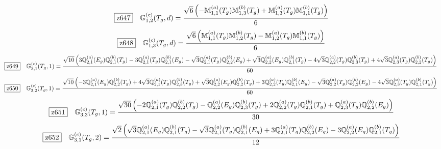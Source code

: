 \documentclass[fleqn,10pt,landscape]{jsarticle}
\begin{document}
\begin{dmath*}
\hspace*{3mm}\fbox{z647}\quad \mathbb{G}_{1,2}^{(c)}(T_{g},d)=\frac{\sqrt{6} \left(- \mathbb{M}_{1,1}^{(a)}(T_{g}) \mathbb{M}_{1,3}^{(b)}(T_{g}) + \mathbb{M}_{1,3}^{(a)}(T_{g}) \mathbb{M}_{1,1}^{(b)}(T_{g})\right)}{6}
\end{dmath*}
\begin{dmath*}
\hspace*{3mm}\fbox{z648}\quad \mathbb{G}_{1,3}^{(c)}(T_{g},d)=\frac{\sqrt{6} \left(\mathbb{M}_{1,1}^{(a)}(T_{g}) \mathbb{M}_{1,2}^{(b)}(T_{g}) - \mathbb{M}_{1,2}^{(a)}(T_{g}) \mathbb{M}_{1,1}^{(b)}(T_{g})\right)}{6}
\end{dmath*}
\begin{dmath*}
\hspace*{3mm}\fbox{z649}\quad \mathbb{G}_{3,1}^{(c)}(T_{g},1)=\frac{\sqrt{10} \left(3 \mathbb{Q}_{2,1}^{(a)}(E_{g}) \mathbb{Q}_{2,1}^{(b)}(T_{g}) - 3 \mathbb{Q}_{2,1}^{(a)}(T_{g}) \mathbb{Q}_{2,1}^{(b)}(E_{g}) - \sqrt{3} \mathbb{Q}_{2,1}^{(a)}(T_{g}) \mathbb{Q}_{2,2}^{(b)}(E_{g}) + \sqrt{3} \mathbb{Q}_{2,2}^{(a)}(E_{g}) \mathbb{Q}_{2,1}^{(b)}(T_{g}) - 4 \sqrt{3} \mathbb{Q}_{2,2}^{(a)}(T_{g}) \mathbb{Q}_{2,3}^{(b)}(T_{g}) + 4 \sqrt{3} \mathbb{Q}_{2,3}^{(a)}(T_{g}) \mathbb{Q}_{2,2}^{(b)}(T_{g})\right)}{60}
\end{dmath*}
\begin{dmath*}
\hspace*{3mm}\fbox{z650}\quad \mathbb{G}_{3,2}^{(c)}(T_{g},1)=\frac{\sqrt{10} \left(- 3 \mathbb{Q}_{2,1}^{(a)}(E_{g}) \mathbb{Q}_{2,2}^{(b)}(T_{g}) + 4 \sqrt{3} \mathbb{Q}_{2,1}^{(a)}(T_{g}) \mathbb{Q}_{2,3}^{(b)}(T_{g}) + \sqrt{3} \mathbb{Q}_{2,2}^{(a)}(E_{g}) \mathbb{Q}_{2,2}^{(b)}(T_{g}) + 3 \mathbb{Q}_{2,2}^{(a)}(T_{g}) \mathbb{Q}_{2,1}^{(b)}(E_{g}) - \sqrt{3} \mathbb{Q}_{2,2}^{(a)}(T_{g}) \mathbb{Q}_{2,2}^{(b)}(E_{g}) - 4 \sqrt{3} \mathbb{Q}_{2,3}^{(a)}(T_{g}) \mathbb{Q}_{2,1}^{(b)}(T_{g})\right)}{60}
\end{dmath*}
\begin{dmath*}
\hspace*{3mm}\fbox{z651}\quad \mathbb{G}_{3,3}^{(c)}(T_{g},1)=\frac{\sqrt{30} \left(- 2 \mathbb{Q}_{2,1}^{(a)}(T_{g}) \mathbb{Q}_{2,2}^{(b)}(T_{g}) - \mathbb{Q}_{2,2}^{(a)}(E_{g}) \mathbb{Q}_{2,3}^{(b)}(T_{g}) + 2 \mathbb{Q}_{2,2}^{(a)}(T_{g}) \mathbb{Q}_{2,1}^{(b)}(T_{g}) + \mathbb{Q}_{2,3}^{(a)}(T_{g}) \mathbb{Q}_{2,2}^{(b)}(E_{g})\right)}{30}
\end{dmath*}
\begin{dmath*}
\hspace*{3mm}\fbox{z652}\quad \mathbb{G}_{3,1}^{(c)}(T_{g},2)=\frac{\sqrt{2} \left(\sqrt{3} \mathbb{Q}_{2,1}^{(a)}(E_{g}) \mathbb{Q}_{2,1}^{(b)}(T_{g}) - \sqrt{3} \mathbb{Q}_{2,1}^{(a)}(T_{g}) \mathbb{Q}_{2,1}^{(b)}(E_{g}) + 3 \mathbb{Q}_{2,1}^{(a)}(T_{g}) \mathbb{Q}_{2,2}^{(b)}(E_{g}) - 3 \mathbb{Q}_{2,2}^{(a)}(E_{g}) \mathbb{Q}_{2,1}^{(b)}(T_{g})\right)}{12}
\end{dmath*}
\end{document}
